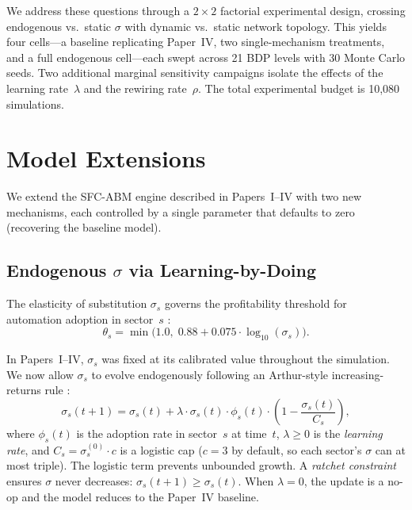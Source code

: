 \documentclass[12pt,a4paper]{article}
\begin{document}
We address these questions through a $2 \times 2$ factorial experimental
design, crossing endogenous vs.\ static $\sigma$ with dynamic vs.\ static
network topology. This yields four cells---a baseline replicating Paper~IV,
two single-mechanism treatments, and a full endogenous cell---each swept
across 21 BDP levels with 30 Monte Carlo seeds. Two additional marginal
sensitivity campaigns isolate the effects of the learning rate~$\lambda$
and the rewiring rate~$\rho$. The total experimental budget is 10,080
simulations.


\section{Model Extensions}\label{sec:model}

We extend the SFC-ABM engine described in Papers~I--IV with two new
mechanisms, each controlled by a single parameter that defaults to zero
(recovering the baseline model).

\subsection{Endogenous $\sigma$ via Learning-by-Doing}\label{sec:sigma}

The elasticity of substitution $\sigma_s$ governs the profitability
threshold for automation adoption in sector~$s$
\parencite[see][]{Maciaszek2026a}:
\begin{equation}\label{eq:threshold}
  \theta_s = \min\!\bigl(1.0,\; 0.88 + 0.075 \cdot
  \log_{10}(\sigma_s)\bigr).
\end{equation}

In Papers~I--IV, $\sigma_s$ was fixed at its calibrated value throughout
the simulation. We now allow $\sigma_s$ to evolve endogenously following
an Arthur-style increasing-returns rule
\parencite{Arthur1989,Arrow1962}:
\begin{equation}\label{eq:sigma_dynamics}
  \sigma_s(t+1) = \sigma_s(t) + \lambda \cdot \sigma_s(t) \cdot
  \phi_s(t) \cdot \left(1 - \frac{\sigma_s(t)}{C_s}\right),
\end{equation}
where $\phi_s(t)$ is the adoption rate in sector~$s$ at time~$t$,
$\lambda \ge 0$ is the \emph{learning rate}, and $C_s = \sigma_s^{(0)}
\cdot c$ is a logistic cap ($c = 3$ by default, so each sector's
$\sigma$ can at most triple). The logistic term prevents unbounded growth.
A \emph{ratchet constraint} ensures $\sigma$ never decreases:
$\sigma_s(t+1) \ge \sigma_s(t)$. When $\lambda = 0$, the update is a
no-op and the model reduces to the Paper~IV baseline.
\end{document}
